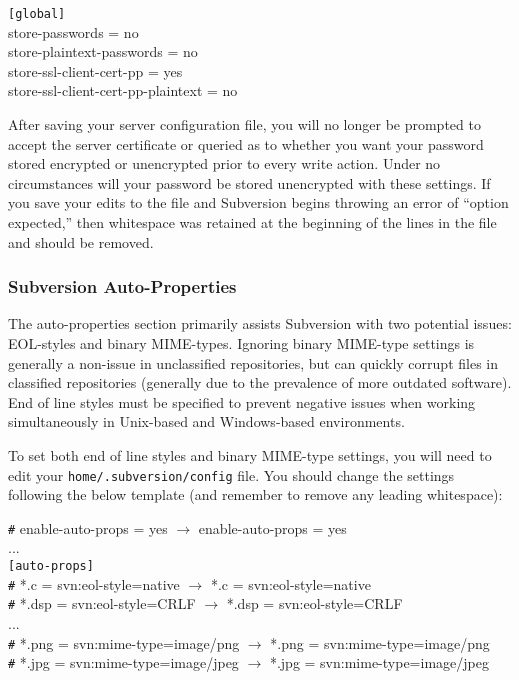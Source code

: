 \documentclass[12pt,letterpaper]{article}
\begin{document}
\begin{shaded}
\noindent\verb|[global]|\\
store-passwords = no\\
store-plaintext-passwords = no\\
store-ssl-client-cert-pp = yes\\
store-ssl-client-cert-pp-plaintext = no
\end{shaded}

After saving your server configuration file, you will no longer be prompted to accept the server certificate or queried as to whether you want your password stored encrypted or unencrypted prior to every write action.  Under no circumstances will your password be stored unencrypted with these settings.  If you save your edits to the file and Subversion begins throwing an error of ``option expected,'' then whitespace was retained at the beginning of the lines in the file and should be removed.

\subsubsection{Subversion Auto-Properties}

The auto-properties section primarily assists Subversion with two potential issues: EOL-styles and binary MIME-types.  Ignoring binary MIME-type settings is generally a non-issue in unclassified repositories, but can quickly corrupt files in classified repositories (generally due to the prevalence of more outdated software).  End of line styles must be specified to prevent negative issues when working simultaneously in Unix-based and Windows-based environments.

To set both end of line styles and binary MIME-type settings, you will need to edit your \verb|home/.subversion/config| file.  You should change the settings following the below template (and remember to remove any leading whitespace):

\begin{shaded}
\noindent\verb|#| enable-auto-props = yes $\rightarrow$ enable-auto-props = yes\\
...\\
\verb|[auto-props]|\\
\verb|#| *.c = svn:eol-style=native $\rightarrow$ *.c = svn:eol-style=native\\
\verb|#| *.dsp = svn:eol-style=CRLF $\rightarrow$ *.dsp = svn:eol-style=CRLF\\
...\\
\verb|#| *.png = svn:mime-type=image/png $\rightarrow$ *.png = svn:mime-type=image/png\\
\verb|#| *.jpg = svn:mime-type=image/jpeg $\rightarrow$ *.jpg = svn:mime-type=image/jpeg
\end{shaded}
\end{document}
